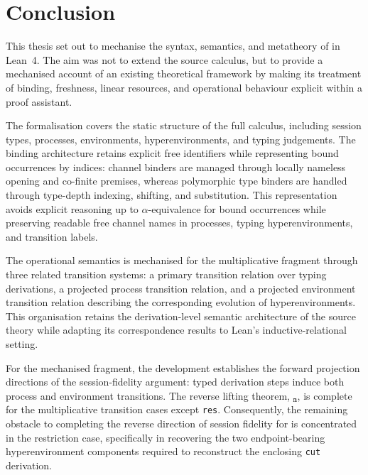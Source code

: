 \section{Conclusion}\label{sec:conclusion}
This thesis set out to mechanise the syntax, semantics, and metatheory of \pill{} in Lean~4. The aim was not to extend the source calculus, but to provide a mechanised account of an existing theoretical framework by making its treatment of binding, freshness, linear resources, and operational behaviour explicit within a proof assistant.

The formalisation covers the static structure of the full \pill{} calculus, including session types, processes, environments, hyperenvironments, and typing judgements. The binding architecture retains explicit free identifiers while representing bound occurrences by indices: channel binders are managed through locally nameless opening and co-finite premises, whereas polymorphic type binders are handled through type-depth indexing, shifting, and substitution. This representation avoids explicit reasoning up to $\alpha$-equivalence for bound occurrences while preserving readable free channel names in processes, typing hyperenvironments, and transition labels.

The operational semantics is mechanised for the multiplicative fragment \pimll{} through three related transition systems: a primary transition relation over typing derivations, a projected process transition relation, and a projected environment transition relation describing the corresponding evolution of hyperenvironments. This organisation retains the derivation-level semantic architecture of the source theory while adapting its correspondence results to Lean's inductive-relational setting.

For the mechanised fragment, the development establishes the forward projection directions of the session-fidelity argument: typed derivation steps induce both process and environment transitions. The reverse lifting theorem, $_{\texttt{m}}$, is complete for the multiplicative transition cases except \texttt{res}. Consequently, the remaining obstacle to completing the reverse direction of session fidelity for \pimll{} is concentrated in the restriction case, specifically in recovering the two endpoint-bearing hyperenvironment components required to reconstruct the enclosing \texttt{cut} derivation.

